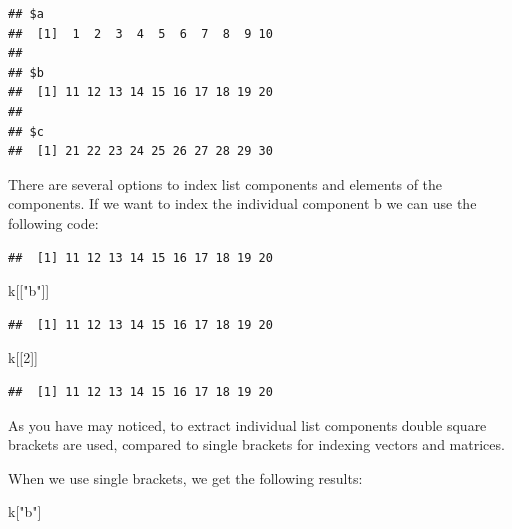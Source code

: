 \documentclass[]{book}
\newenvironment{Shaded}{\begin{snugshade}}{\end{snugshade}}
\newcommand{\DecValTok}[1]{\textcolor[rgb]{0.00,0.00,0.81}{#1}}
\newcommand{\StringTok}[1]{\textcolor[rgb]{0.31,0.60,0.02}{#1}}
\newcommand{\OperatorTok}[1]{\textcolor[rgb]{0.81,0.36,0.00}{\textbf{#1}}}
\newcommand{\NormalTok}[1]{#1}
\theoremstyle{definition}
\theoremstyle{definition}
\theoremstyle{definition}
\theoremstyle{remark}
\begin{document}
\begin{verbatim}
## $a
##  [1]  1  2  3  4  5  6  7  8  9 10
## 
## $b
##  [1] 11 12 13 14 15 16 17 18 19 20
## 
## $c
##  [1] 21 22 23 24 25 26 27 28 29 30
\end{verbatim}

There are several options to index list components and elements of the
components. If we want to index the individual component b we can use
the following code:

\begin{Shaded}
\end{Shaded}

\begin{verbatim}
##  [1] 11 12 13 14 15 16 17 18 19 20
\end{verbatim}

\begin{Shaded}
\begin{Highlighting}[]
\NormalTok{k[[}\StringTok{"b"}\NormalTok{]]}
\end{Highlighting}
\end{Shaded}

\begin{verbatim}
##  [1] 11 12 13 14 15 16 17 18 19 20
\end{verbatim}

\begin{Shaded}
\begin{Highlighting}[]
\NormalTok{k[[}\DecValTok{2}\NormalTok{]]}
\end{Highlighting}
\end{Shaded}

\begin{verbatim}
##  [1] 11 12 13 14 15 16 17 18 19 20
\end{verbatim}

As you have may noticed, to extract individual list components double
square brackets are used, compared to single brackets for indexing
vectors and matrices.

When we use single brackets, we get the following results:

\begin{Shaded}
\begin{Highlighting}[]
\NormalTok{k[}\StringTok{"b"}\NormalTok{]}
\end{Highlighting}
\end{Shaded}
\end{document}
